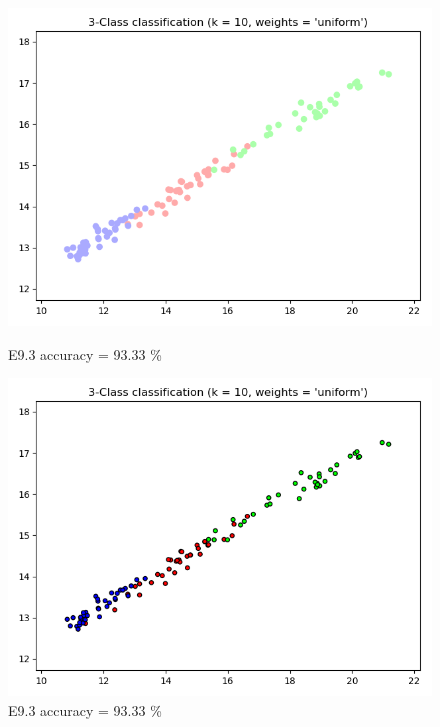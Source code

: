 \documentclass{classrep}
\begin{document}
\begin{figure}[H]
\begin{minipage}{0.5\linewidth}
				\includegraphics[scale=0.25]{KNN_seed_9_5.png}
				\caption{E9.3 accuracy = 93.33 \%}
				\label{E9.3}
			\end{minipage}
			\begin{minipage}{0.5\linewidth}
				\centering
				\includegraphics[scale=0.25]{KNN_seed_9_6.png}
				\caption{E9.3 accuracy = 93.33 \%}
				\label{E9.3}
			\end{minipage}
			\begin{minipage}{0.5\linewidth}
				\centering

\end{minipage}
\end{figure}
\end{document}
